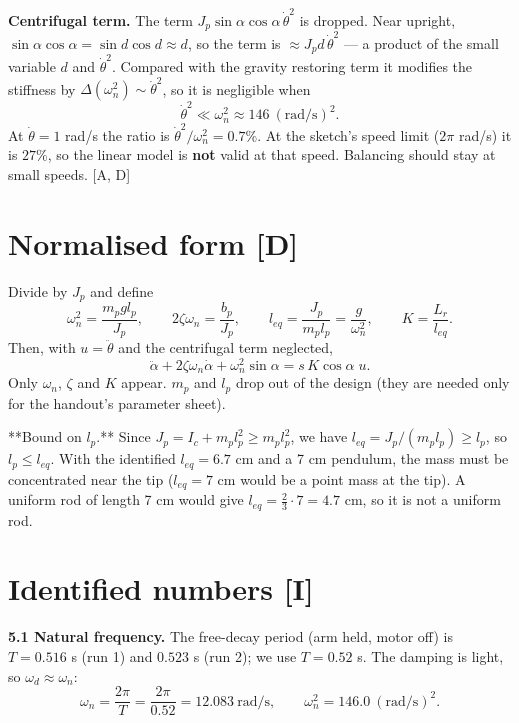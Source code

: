 \documentclass[11pt,a4paper]{article}
\begin{document}
\textbf{Centrifugal term.} The term $J_p\sin\alpha\cos\alpha\,\dot\theta^2$ is dropped. Near upright, $\sin\alpha\cos\alpha=\sin d\cos d\approx d$, so the term is $\approx J_pd\,\dot\theta^2$ — a product of the small variable $d$ and $\dot\theta^2$. Compared with the gravity restoring term it modifies the stiffness by $\Delta(\omega_n^2)\sim\dot\theta^2$, so it is negligible when
\begin{equation*}
\dot\theta^2\ll\omega_n^2\approx146\ (\text{rad/s})^2 .
\end{equation*}
At $\dot\theta=1$ rad/s the ratio is $\dot\theta^2/\omega_n^2=0.7\%$. At the sketch's speed limit ($2\pi$ rad/s) it is $27\%$, so the linear model is \textbf{not} valid at that speed. Balancing should stay at small speeds. [A, D]


\section{Normalised form [D]}

Divide by $J_p$ and define
\begin{equation*}
\omega_n^2=\frac{m_pgl_p}{J_p},\qquad
2\zeta\omega_n=\frac{b_p}{J_p},\qquad
l_{eq}=\frac{J_p}{m_pl_p}=\frac{g}{\omega_n^2},\qquad
K=\frac{L_r}{l_{eq}} .
\end{equation*}
Then, with $u=\ddot\theta$ and the centrifugal term neglected,
\begin{equation*}
\boxed{\ddot\alpha+2\zeta\omega_n\dot\alpha+\omega_n^2\sin\alpha=s\,K\cos\alpha\;u .}
\end{equation*}
Only $\omega_n$, $\zeta$ and $K$ appear. $m_p$ and $l_p$ drop out of the design (they are needed only for the handout's parameter sheet).

**Bound on $l_p$.** Since $J_p=I_c+m_pl_p^2\ge m_pl_p^2$, we have $l_{eq}=J_p/(m_pl_p)\ge l_p$, so $l_p\le l_{eq}$. With the identified $l_{eq}=6.7$ cm and a 7 cm pendulum, the mass must be concentrated near the tip ($l_{eq}=7$ cm would be a point mass at the tip). A uniform rod of length 7 cm would give $l_{eq}=\tfrac23\cdot7=4.7$ cm, so it is not a uniform rod.


\section{Identified numbers [I]}

\textbf{5.1 Natural frequency.} The free-decay period (arm held, motor off) is $T=0.516$ s (run 1) and $0.523$ s (run 2); we use $T=0.52$ s. The damping is light, so $\omega_d\approx\omega_n$:
\begin{equation*}
\omega_n=\frac{2\pi}{T}=\frac{2\pi}{0.52}=12.083\ \text{rad/s},\qquad \omega_n^2=146.0\ (\text{rad/s})^2 .
\end{equation*}
\end{document}
